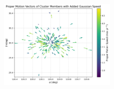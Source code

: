 \documentclass{article}
\begin{document}
	\begin{figure}[h] %
		\centering
		\includegraphics[width=0.5\textwidth]{gaussian-speed.png} %
		\caption{} %
		\label{fig:Gaussian} %
	\end{figure}
	
\end{document}
